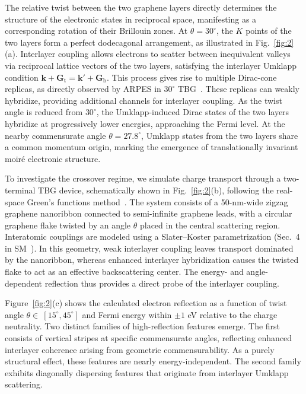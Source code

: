 \documentclass[reprint,
superscriptaddress,amsmath,amssymb,aps,prl]{revtex4-2}
\begin{document}
The relative twist between the two graphene layers directly determines the structure of the electronic states in reciprocal space, manifesting as a corresponding rotation of their Brillouin zones. At $\theta = 30^\circ$, the $K$ points of the two layers form a perfect dodecagonal arrangement, as illustrated in Fig.~\ref{fig:2}(a). Interlayer coupling allows electrons to scatter between inequivalent valleys via reciprocal lattice vectors of the two layers, satisfying the interlayer Umklapp condition $
\mathbf{k}+\mathbf{G}_\mathrm{t}=\mathbf{k}'+\mathbf{G}_\mathrm{b}$.
This process gives rise to multiple Dirac-cone replicas, as directly observed by ARPES in $30^\circ$ TBG~\cite{ahn2018dirac}. These replicas can weakly hybridize, providing additional channels for interlayer coupling. As the twist angle is reduced from $30^\circ$, the Umklapp-induced Dirac states of the two layers hybridize at progressively lower energies, approaching the Fermi level. At the nearby commensurate angle $\theta = 27.8^\circ$, Umklapp states from the two layers share a common momentum origin, marking the emergence of translationally invariant moir\'{e} electronic structure.


To investigate the crossover regime, we simulate charge transport through a two-terminal TBG device, schematically shown in Fig.~\ref{fig:2}(b), following the real-space Green's functions method~\cite{datta_electronic_1995, chakraborti2024electron}. The system consists of a 50-nm-wide zigzag graphene nanoribbon connected to semi-infinite graphene leads, with a circular graphene flake twisted by an angle $\theta$ placed in the central scattering region. Interatomic couplings are modeled using a Slater--Koster parametrization (Sec.~4 in SM~\cite{SI}). In this geometry, weak interlayer coupling leaves transport dominated by the nanoribbon, whereas enhanced interlayer hybridization causes the twisted flake to act as an effective backscattering center. The energy- and angle-dependent reflection thus provides a direct probe of the interlayer coupling.



Figure~\ref{fig:2}(c) shows the calculated electron reflection as a function of twist angle $\theta \in~[15^\circ,45^\circ]$ and Fermi energy within $\pm1$ eV relative to the charge neutrality. Two distinct families of high-reflection features emerge. The first consists of vertical stripes at specific commensurate angles, reflecting enhanced interlayer coherence arising from geometric commensurability. As a purely structural effect, these features are nearly energy-independent. The second family exhibits diagonally dispersing features that originate from interlayer Umklapp scattering.
\end{document}
